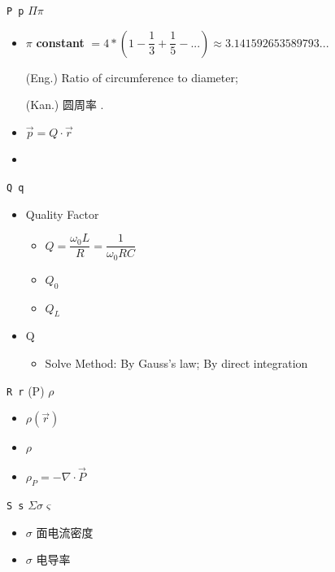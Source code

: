 \texttt{P p} $\Pi \pi$\begin{itemize}

\item $\pi$ \textbf{constant} $= 4*(1-\dfrac{1}{3}+\dfrac{1}{5}-...) \approx 3.141592653589793...$

(Eng.) Ratio of circumference to diameter;

(Kan.) 圆周率 .

\item $\vec{p} = Q \cdot \vec r$

\item 

\end{itemize}

\texttt{Q q} \begin{itemize}

\item Quality Factor \begin{itemize}

\item $Q = \dfrac{\omega_0 L}{R} = \dfrac 1 {\omega_0 R C}$

\item $Q_0$

\item $Q_L$

\end{itemize}



\item Q \begin{itemize}

\item Solve Method: By Gauss's law; By direct integration 

\end{itemize}



\end{itemize}

\texttt{R r} (P) $\rho$\begin{itemize}

\item $\rho(\vec{r})$

\item $\rho$

\item $\rho_P = -\nabla\cdot\vec{P}$

\end{itemize}

\texttt{S s} $\Sigma \sigma \varsigma$\begin{itemize}

\item $\sigma$ 面电流密度

\item $\sigma$ 电导率

\end{itemize}

